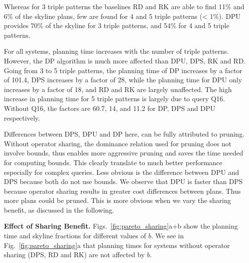 Whereas for 3 triple patterns the baselines RD and RK are able to find 11\% and 6\% of the skyline plans, few
are found for 4 and 5 triple patterns (< 1\%). DPU provides 
70\% of the skyline for 3 triple patterns, and 54\% for 4 and 5 triple patterns. 


For all systems, planning time increases with the number of triple
patterns. However, the DP algorithm is much more affected than DPU,
DPS, RK and RD. Going from 3 to 5 triple patterns, the planning time
of DP increases by a factor of 101.4, DPS increases by a factor of 28,
while the planning time for DPU only increases by a factor of 18, and
RD and RK are largely unaffected. The high increase in planning time
for 5 triple patterns is largely due to query Q16. Without Q16, the
factors are 60.7, 14, and 11.2 for DP, DPS and DPU respectively.

Differences between DPS, DPU and DP here, can be fully attributed to pruning. Without operator sharing, the dominance relation used for pruning does not involve bounds, thus enables more aggressive pruning and saves the time needed for computing bounds. This clearly translate to much better performance especially for complex queries. Less obvious is the difference between DPU and DPS because both do not use bounds. We observe that DPU is faster than DPS because operator sharing results in greater cost differences between plans. Thus more plans could be pruned. This is more obvious when we vary the sharing benefit, as discussed in the following.  




\textbf{Effect of Sharing Benefit.} Figs.~\ref{fig:pareto_sharing}a+b
show the planning time and skyline fractions for different values of $b$. We see in Fig.~\ref{fig:pareto_sharing}a that planning times for systems without operator sharing (DPS, RD and RK) are not affected by $b$. 

